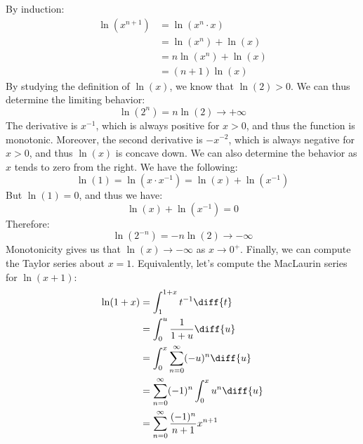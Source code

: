         By induction:
        \begin{subequations}
            \begin{align}
                \ln(x^{n+1})&=\ln(x^{n}\cdot{x})\\
                &=\ln(x^{n})+\ln(x)\\
                &=n\ln(x^{n})+\ln(x)\\
                &=(n+1)\ln(x)
            \end{align}
        \end{subequations}
        By studying the definition of $\ln(x)$, we know that
        $\ln(2)>0$. We can thus determine the limiting behavior:
        \begin{equation}
            \ln(2^{n})=n\ln(2)\rightarrow{+\infty}
        \end{equation}
        The derivative is $x^{-1}$, which is always positive
        for $x>0$, and thus the function is monotonic. Moreover,
        the second derivative is $-x^{-2}$, which is always
        negative for $x>0$, and thus $\ln(x)$ is concave down.
        We can also determine the behavior as $x$ tends to
        zero from the right. We have the following:
        \begin{equation}
            \ln(1)=\ln(x\cdot{x}^{-1})=\ln(x)+\ln(x^{-1})
        \end{equation}
        But $\ln(1)=0$, and thus we have:
        \begin{equation}
            \ln(x)+\ln(x^{-1})=0
        \end{equation}
        Therefore:
        \begin{equation}
            \ln(2^{-n})=-n\ln(2)\rightarrow{-\infty}
        \end{equation}
        Monotonicity gives us that $\ln(x)\rightarrow{-\infty}$
        as $x\rightarrow{0^{+}}$. Finally, we can compute the
        Taylor series about $x=1$. Equivalently, let's compute
        the MacLaurin series for $\ln(x+1)$:
        \begin{align}
            \ln(1+x)&=\int_{1}^{1+x}t^{-1}\diff{t}\\
            &=\int_{0}^{u}\frac{1}{1+u}\diff{u}\\
            &=\int_{0}^{x}\sum_{n=0}^{\infty}(-u)^{n}\diff{u}\\
            &=\sum_{n=0}^{\infty}(-1)^{n}\int_{0}^{x}u^{n}\diff{u}\\
            &=\sum_{n=0}^{\infty}\frac{(-1)^{n}}{n+1}x^{n+1}
        \end{align}
